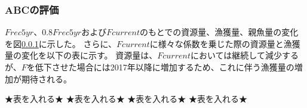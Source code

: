\subsubsection{ABCの評価}
$Frec5yr$、$0.8Frec5yr$および$Fcurrent$のもとでの資源量、漁獲量、親魚量の変化を図\ref{}に示した。
さらに、$Fcurrent$に様々な係数を乗じた際の資源量と漁獲量の変化を以下の表に示す。
資源量は、$Fcurrent$においては継続して減少するが、$F$を低下させた場合には2017年以降に増加するため、これに伴う漁獲量の増加が期待される。

★表を入れる★
★表を入れる★
★表を入れる★
★表を入れる★
